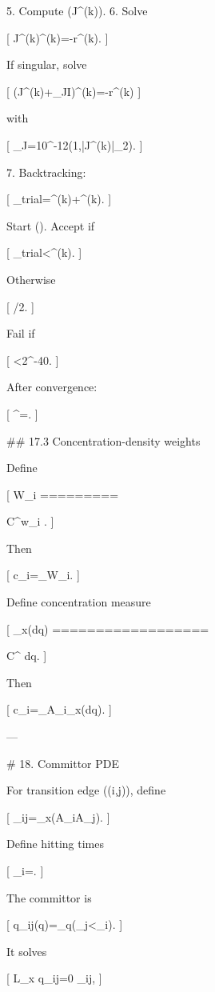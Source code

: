 5. Compute (J^{(k)}).
6. Solve

[
J^{(k)}\Delta\lambda^{(k)}=-r^{(k)}.
]

If singular, solve

[
(J^{(k)}+\epsilon_JI)\Delta\lambda^{(k)}=-r^{(k)}
]

with

[
\epsilon_J=10^{-12}\max(1,|J^{(k)}|_2).
]

7. Backtracking:

[
\lambda_{\rm trial}=\lambda^{(k)}+\alpha\Delta\lambda^{(k)}.
]

Start (). Accept if

[
\eta_{\rm trial}<\eta^{(k)}.
]

Otherwise

[
\alpha\leftarrow \alpha/2.
]

Fail if

[
\alpha<2^{-40}.
]

After convergence:

[
\lambda^\star=\lambda.
]

## 17.3 Concentration-density weights

Define

[
W_{i\ell}
=========

C^\circ w_{i\ell}
\exp{}.
]

Then

[
c_i=\sum_\ell W_{i\ell}.
]

Define concentration measure

[
\rho_x(\mathrm dq)
==================

C^\circ
\exp{}
\mathrm dq.
]

Then

[
c_i=\int_{A_i}\rho_x(\mathrm dq).
]

---

# 18. Committor PDE

For transition edge ((i,j)), define

[
\Omega_{ij}=\Omega_x\setminus(A_i\cup A_j).
]

Define hitting times

[
\tau_i=.
]

The committor is

[
q_{ij}(q)=\Pr_q(\tau_j<\tau_i).
]

It solves

[
L_x q_{ij}=0
\quad{}\Omega_{ij},
]

